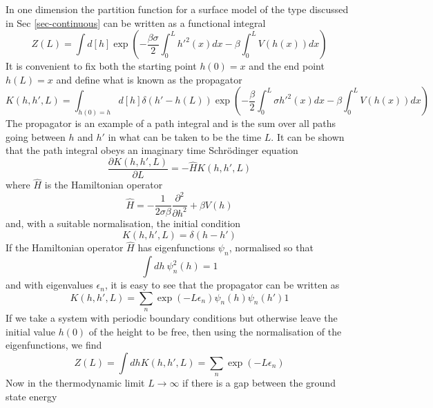 In one dimension the partition function for a surface model of the type discussed in Sec \ref{sec-continuous} can be written as a functional integral  
\begin{equation}
    Z(L)  = \int d[h]\exp\left(-\frac{\beta\sigma}{2}\int_0^L h'^2(x) dx -\beta\int_0^L  V(h(x)) dx\right)
\end{equation}
It is convenient to fix both the starting point $h(0)=x$ and the end point $h(L)=x$ and define what is known as the propagator
\begin{equation}
    K(h,h',L)=\int_{h(0)=h} d[h] \delta(h' -h(L)) \exp\left(-\frac{\beta}{2}\int_0^L \sigma h'^2(x) dx -\beta \int_0^L  V(h(x)) dx\right)
    \label{prog}
\end{equation}
The propagator is an example of a path integral and is the sum over all paths going between 
$h$ and $h'$ in what can be taken to be the time $L$.  It can be shown \cite{matsubara_new_1955,h_arthur_weldon_scalar_1989} that the path integral obeys an imaginary time Schr\"odinger equation
\begin{equation}
    \frac{\partial  K(h,h',L)}{\partial L} = -\hat H K(h,h',L)
\end{equation}
where $\hat H$ is the Hamiltonian operator
\begin{equation}
    \hat H = -\frac{1}{2\sigma\beta}\frac{\partial^2 }{\partial h^2} + \beta V(h)
\end{equation}
and, with a suitable normalisation, the initial condition
\begin{equation}
    K(h,h',L)=\delta(h-h')
\end{equation}
If the Hamiltonian operator $\hat H$ has eigenfunctions $\psi_n$, normalised so that
\begin{equation}
    \int dh \ \psi^2_n(h) = 1
\end{equation}
 and with eigenvalues $\epsilon_n$, it is easy to see that the propagator can be written as
\begin{equation}
    K(h,h',L)= \sum_n \exp(-L\epsilon_n)\psi_n(h)\psi_n(h')1
\end{equation}
If we take a system with periodic boundary conditions but otherwise leave the initial value $h(0)$ of the height to be free, then using the normalisation of the eigenfunctions, we find
\begin{equation}
    Z(L) = \int dh K(h,h',L) = \sum_n \exp(-L\epsilon_n)
\end{equation}
Now in the thermodynamic limit $L\to\infty$ if there is a gap between the ground state energy
